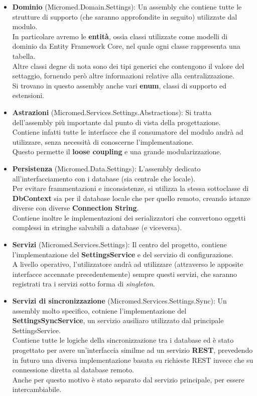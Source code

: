\documentclass[\main/tesi.tex]{subfiles}
\begin{document}
\begin{itemize}
    \item \textbf{Dominio} (Micromed.Domain.Settings): Un assembly che contiene tutte le strutture di supporto (che saranno approfondite in seguito) utilizzate dal modulo.\\In particolare avremo le \textbf{entità}, ossia classi utilizzate come modelli di dominio da Entity Framework Core, nel quale ogni classe rappresenta una tabella.\\Altre classi degne di nota sono dei tipi generici che contengono il valore del settaggio, fornendo però altre informazioni relative alla centralizzazione.\\Si trovano in questo assembly anche vari \textbf{enum}, classi di supporto ed estensioni.
    \item \textbf{Astrazioni} (Micromed.Services.Settings.Abstractions): Si tratta dell'assembly più importante dal punto di vista della progettazione.\\Contiene infatti tutte le interfacce che il consumatore del modulo andrà ad utilizzare, senza necessità di conoscerne l'implementazione.\\Questo permette il \textbf{loose coupling} e una grande modularizzazione.
    \item \textbf{Persistenza} (Micromed.Data.Settings): L'assembly dedicato all'interfacciamento con i database (sia centrale che locale).\\Per evitare frammentazioni e inconsistenze, si utilizza la stessa sottoclasse di \textbf{DbContext} sia per il database locale che per quello remoto, creando istanze diverse con diverse \textbf{Connection String}.\\Contiene inoltre le implementazioni dei serializzatori che convertono oggetti complessi in stringhe salvabili a database (e viceversa).
    \item \textbf{Servizi} (Micromed.Services.Settings): Il centro del progetto, contiene l'implementazione del \textbf{SettingsService} e del servizio di configurazione.\\A livello operativo, l'utilizzatore andrà ad utilizzare (attraverso le apposite interfacce accennate precedentemente) sempre questi servizi, che saranno registrati tra i servizi sotto forma di \textit{singleton}.
    \item \textbf{Servizi di sincronizzazione} (Micromed.Services.Settings.Sync): Un assembly molto specifico, cotniene l'implementazione del \textbf{SettingsSyncService}, un servizio ausiliaro utilizzato dal principale SettingsService.\\Contiene tutte le logiche della sincronizzazione tra i database ed è stato progettato per avere un'interfaccia similme ad un servizio \textbf{REST}, prevedendo in futuro una diversa implementazione basata su richieste REST invece che su connessione diretta al database remoto.\\Anche per questo motivo è stato separato dal servizio principale, per essere intercambiabile.

\end{itemize}
\end{document}

